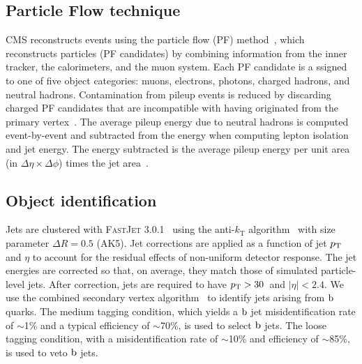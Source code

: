 \subsection{Particle Flow technique}

CMS reconstructs events using the particle flow (PF) method~\cite{PF}, which reconstructs particles
(PF candidates) by combining information from the inner tracker, the calorimeters, and the muon
system.  Each PF candidate is a ssigned to one of five object categories: muons, electrons, photons,
charged hadrons, and neutral hadrons.  Contamination from pileup events is reduced by discarding
charged PF candidates that are incompatible with having originated from the primary
vertex~\cite{CMS-PAS-JME-14-001}.   The average pileup energy due to neutral hadrons is computed
event-by-event and subtracted from the energy when computing lepton isolation and jet energy.  The
energy subtracted is  the average pileup energy per unit area (in $\Delta\eta \times \Delta\phi$)
times the jet area~\cite{Fastjet1, Fastjet2}.

\subsection{Object identification}

Jets are clustered with \textsc{FastJet 3.0.1}~\cite{Cacciari:2011ma} using the anti-$k_\textrm{T}$
algorithm~\cite{antikt} with size parameter $\Delta R=0.5$ (AK5).  Jet corrections are applied as a
function of jet $p_{\mathrm{T}}$ and $\eta$ to account for the residual effects of non-uniform detector
response.  
The  jet energies are corrected so that, on average, they match those of simulated particle-level
jets. After correction, jets are required to have $p_{\mathrm{T}} > 30$~\GeV and $|\eta| < 2.4$.  We use the
combined secondary vertex algorithm~\cite{btag7TeV,btag8TeV} to identify jets arising from $\mathrm{b}$
quarks. The medium tagging condition, which yields a $\mathrm{b}$  jet misidentification rate of
$\sim$1\% and a typical efficiency of $\sim$70\%, is used to select $\mathrm{b}$ jets. The loose tagging
condition, with a misidentification rate of $\sim$10\% and efficiency of $\sim$85\%, is used to veto
$\mathrm{b}$ jets.  

